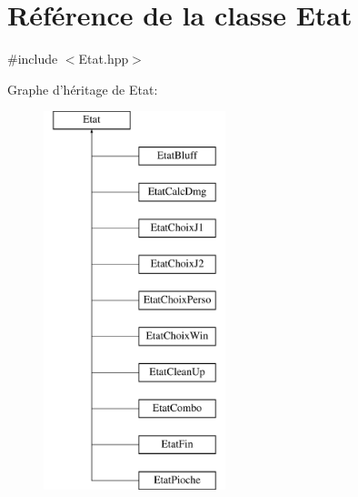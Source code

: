 \hypertarget{class_etat}{\section{Référence de la classe Etat}
\label{class_etat}
}


{\ttfamily \#include $<$Etat.\-hpp$>$}

Graphe d'héritage de Etat\-:\begin{figure}[H]
\begin{center}
\leavevmode
\includegraphics[height=11.000000cm]{class_etat}
\end{center}
\end{figure}
